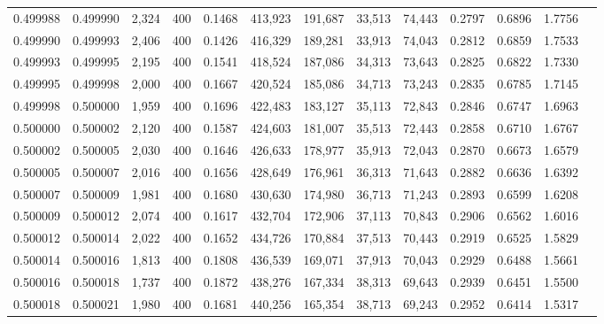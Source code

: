 \begin{tabular}{rrrrrrrrrrrrr}
0.499988 & 0.499990 &  2,324 & 400 &                                     0.1468 & 413,923 & 191,687 &  33,513 &  74,443 & 0.2797 & 0.6896 & 1.7756 \\
0.499990 & 0.499993 &  2,406 & 400 &                                     0.1426 & 416,329 & 189,281 &  33,913 &  74,043 & 0.2812 & 0.6859 & 1.7533 \\
0.499993 & 0.499995 &  2,195 & 400 &                                     0.1541 & 418,524 & 187,086 &  34,313 &  73,643 & 0.2825 & 0.6822 & 1.7330 \\
0.499995 & 0.499998 &  2,000 & 400 &                                     0.1667 & 420,524 & 185,086 &  34,713 &  73,243 & 0.2835 & 0.6785 & 1.7145 \\
0.499998 & 0.500000 &  1,959 & 400 &                                     0.1696 & 422,483 & 183,127 &  35,113 &  72,843 & 0.2846 & 0.6747 & 1.6963 \\
0.500000 & 0.500002 &  2,120 & 400 &                                     0.1587 & 424,603 & 181,007 &  35,513 &  72,443 & 0.2858 & 0.6710 & 1.6767 \\
0.500002 & 0.500005 &  2,030 & 400 &                                     0.1646 & 426,633 & 178,977 &  35,913 &  72,043 & 0.2870 & 0.6673 & 1.6579 \\
0.500005 & 0.500007 &  2,016 & 400 &                                     0.1656 & 428,649 & 176,961 &  36,313 &  71,643 & 0.2882 & 0.6636 & 1.6392 \\
0.500007 & 0.500009 &  1,981 & 400 &                                     0.1680 & 430,630 & 174,980 &  36,713 &  71,243 & 0.2893 & 0.6599 & 1.6208 \\
0.500009 & 0.500012 &  2,074 & 400 &                                     0.1617 & 432,704 & 172,906 &  37,113 &  70,843 & 0.2906 & 0.6562 & 1.6016 \\
0.500012 & 0.500014 &  2,022 & 400 &                                     0.1652 & 434,726 & 170,884 &  37,513 &  70,443 & 0.2919 & 0.6525 & 1.5829 \\
0.500014 & 0.500016 &  1,813 & 400 &                                     0.1808 & 436,539 & 169,071 &  37,913 &  70,043 & 0.2929 & 0.6488 & 1.5661 \\
0.500016 & 0.500018 &  1,737 & 400 &                                     0.1872 & 438,276 & 167,334 &  38,313 &  69,643 & 0.2939 & 0.6451 & 1.5500 \\
0.500018 & 0.500021 &  1,980 & 400 &                                     0.1681 & 440,256 & 165,354 &  38,713 &  69,243 & 0.2952 & 0.6414 & 1.5317 \\

\end{tabular}
